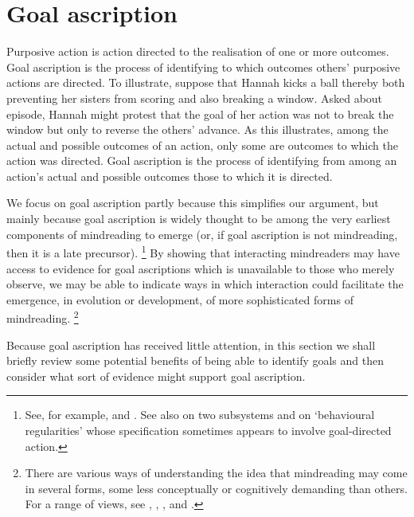 \documentclass[14pt,a4paper]{extarticle}
\begin{document}
\section{Goal ascription}
Purposive action is action directed to the realisation of one or more outcomes.
Goal ascription is the process of identifying to which outcomes others' purposive actions are directed.
To illustrate, suppose that
Hannah kicks a ball thereby both preventing her sisters from scoring and also breaking a window.
Asked about episode,
Hannah might protest that the goal of her action was not to break the window but only to reverse the others' advance.
As this illustrates,
among the actual and possible outcomes of an action,
only some are outcomes to which the action was directed.
Goal ascription is the process of identifying from among an action's actual and possible outcomes
those to which it is directed.

We focus on goal ascription 
partly because this simplifies our argument,
but mainly because goal ascription is widely thought to be among the very earliest components of mindreading to emerge (or, if goal ascription is not mindreading, then it is a late precursor).%
\footnote{
See, for example,
\citet{Gergely:1995sq} and 
\citet{Woodward:1998dm}.
See also
\citet[p.\ 111, Box 1]{Baillargeon:gx}
on two subsystems
and 
\citet{Povinelli:2001jf} on `behavioural regularities' whose specification sometimes appears to involve goal-directed action.
}
By showing that
  interacting mindreaders may have access to 
  evidence for goal ascriptions 
  which is unavailable to those who merely observe,
we may be able to indicate ways in which interaction could facilitate the emergence, in evolution or development, of more sophisticated forms of mindreading.%
\footnote{
There are various ways of understanding the idea that mindreading may come in several forms, some less conceptually or cognitively demanding than others.
For a range of views, see
 \citet{Apperly:2009ju},
 \citet{Call:2005qe},
 \citet{Doherty:2006wz},
 \citet{ONeill:2005ff}
 and
 \citet{Wellman:2001if}.
}

Because goal ascription has received little attention,
in this section
we shall 
briefly review some potential benefits of being able to identify goals
and then 
consider what sort of evidence might support goal ascription.
\end{document}
